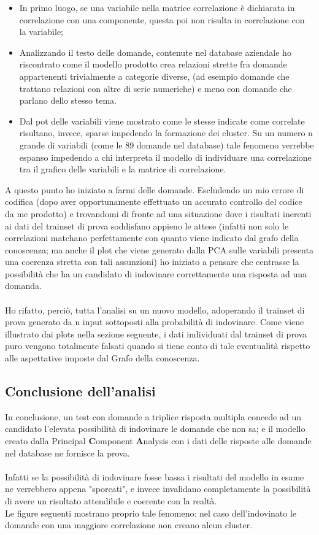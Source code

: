 \begin{itemize}
\item In primo luogo, se una variabile nella matrice correlazione \`e dichiarata in correlazione con una componente, questa poi non risulta in correlazione con la variabile;
\item Analizzando il testo delle domande, contenute nel database aziendale ho riscontrato come il modello prodotto crea relazioni strette fra domande appartenenti trivialmente a categorie diverse, (ad esempio domande che trattano relazioni con altre di serie numeriche) e meno con domande che parlano dello stesso tema.
\item Dal pot delle variabili viene mostrato come le stesse indicate come correlate risultano, invece, sparse impedendo la formazione dei cluster. Su un numero n grande di variabili  (come le 89 domande nel database) tale fenomeno verrebbe espanso impedendo a chi interpreta il modello di individuare una correlazione tra il grafico delle variabili e la matrice di correlazione.
\end{itemize}
A questo punto ho iniziato a farmi delle domande. Escludendo un mio errore di codifica (dopo aver opportunamente effettuato un accurato controllo del codice da me prodotto) e trovandomi di fronte ad una situazione dove i risultati inerenti ai dati del trainset di prova soddisfano appieno le attese
(infatti non solo le correlazioni matchano perfettamente con quanto viene indicato dal grafo della conoscenza; ma anche il plot che viene generato dalla PCA sulle variabili presenta una coerenza stretta con tali assunzioni) ho iniziato a pensare che centrasse la possibilit\`a che ha un candidato di indovinare correttamente una risposta ad una domanda.\\\\
Ho rifatto, perci\`o, tutta l'analisi su un nuovo modello, adoperando il trainset di prova generato da n input sottoposti alla probabilit\`a di indovinare. Come viene illustrato dai plots nella sezione seguente, i dati individuati dal trainset di prova puro vengono totalmente falsati quando si tiene conto di tale eventualit\`a rispetto alle aspettative imposte dal Grafo della conoscenza. 

\subsection{Conclusione dell'analisi}
\label{Conclusione dell'analisi}
In conclusione, un test con domande a triplice risposta multipla concede ad un candidato l'elevata possibilit\`a di indovinare le domande che non sa; e il modello creato dalla {P}rincipal \textbf{C}omponent \textbf{A}nalysis con i dati delle risposte alle domande nel database ne fornisce la prova.\\\\ Infatti se la possibilit\`a di indovinare fosse bassa i risultati del modello in esame ne verrebbero appena "sporcati", e invece invalidano completamente la possibilit\`a di avere un risultato attendibile e coerente con la realt\`a.\\
Le figure seguenti mostrano proprio tale fenomeno: nel caso dell'indovinato le domande con una maggiore correlazione non creano alcun cluster.

